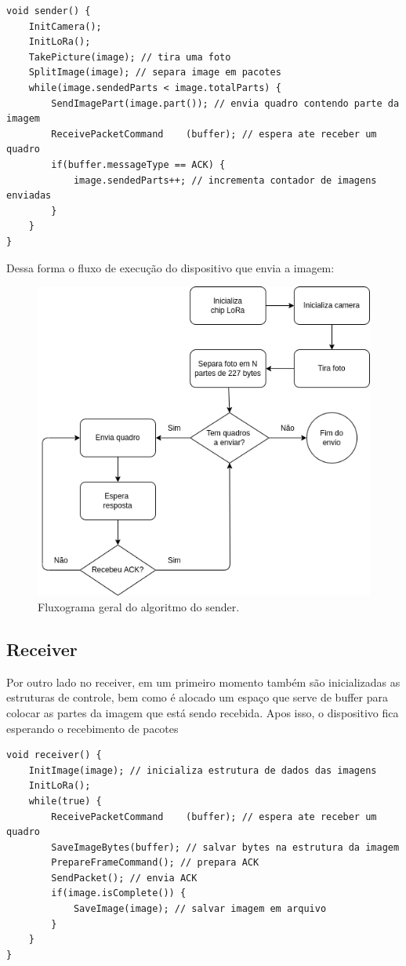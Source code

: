 \documentclass[
article,			%
12pt,				%
oneside,			%
a4paper,			%
english,			%
brazil,				%
sumario=tradicional
]{abntex2}
\begin{document}
\begin{lstlisting}[title=Algoritmo Stop and Wait - Sender]
void sender() {
	InitCamera();
	InitLoRa();
	TakePicture(image); // tira uma foto
	SplitImage(image); // separa image em pacotes
	while(image.sendedParts < image.totalParts) {
		SendImagePart(image.part()); // envia quadro contendo parte da imagem
		ReceivePacketCommand	(buffer); // espera ate receber um quadro
		if(buffer.messageType == ACK) {
			image.sendedParts++; // incrementa contador de imagens enviadas
		}
	}
}
\end{lstlisting}

Dessa forma o fluxo de execução do dispositivo que envia a imagem:

\cleardoublepage
\begin{figure}[h]
  \centering
  \includegraphics[width=.7\textwidth]{fluxogram_sender}
  \caption{\label{fig:sender}Fluxograma geral do algoritmo do sender.}
\end{figure}

\subsection{Receiver}\label{Receiver}
Por outro lado no receiver, em um primeiro momento também são inicializadas as estruturas de controle, bem como é alocado um espaço que serve de buffer para colocar as partes da imagem que está sendo recebida. Apos isso, o dispositivo fica esperando o recebimento de pacotes

\begin{lstlisting}[title=Algoritmo Stop and Wait - Receiver]
void receiver() {
	InitImage(image); // inicializa estrutura de dados das imagens
	InitLoRa();
	while(true) {
		ReceivePacketCommand	(buffer); // espera ate receber um quadro
		SaveImageBytes(buffer); // salvar bytes na estrutura da imagem
		PrepareFrameCommand(); // prepara ACK
		SendPacket(); // envia ACK
		if(image.isComplete()) {
			SaveImage(image); // salvar imagem em arquivo
		}
	}
}
\end{lstlisting}
\end{document}
